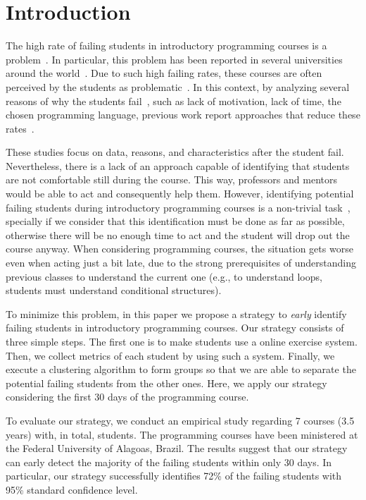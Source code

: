\section{Introduction}

The high rate of failing students in introductory programming courses is a problem~\cite{}. In particular, this problem has been reported in several universities around the world~\cite{}. Due to such high failing rates, these courses are often perceived by the students as problematic~\cite{yadin-inroads-acm-11}. In this context, by analyzing several reasons of why the students fail~\cite{why-dropout-icer06}, such as lack of motivation, lack of time, the chosen programming language, previous work report approaches that reduce these rates~\cite{yadin-inroads-acm-11, xxx}.

These studies focus on data, reasons, and characteristics after the student fail. Nevertheless, there is a lack of an approach capable of identifying that students are not comfortable still during the course. This way, professors and mentors would be able to act and consequently help them. However, identifying potential failing students during introductory programming courses is a non-trivial task~\cite{}, specially if we consider that this identification must be done as far as possible, otherwise there will be no enough time to act and the student will drop out the course anyway. When considering programming courses, the situation gets worse even when acting just a bit late, due to the strong prerequisites of understanding previous classes to understand the current one (e.g., to understand loops, students must understand conditional structures).

To minimize this problem, in this paper we propose a strategy to \textit{early} identify failing students in introductory programming courses. Our strategy consists of three simple steps. The first one is to make students use a online exercise system. Then, we collect metrics of each student by using such a system. Finally, we execute a clustering algorithm to form groups so that we are able to separate the potential failing students from the other ones. Here, we apply our strategy considering the first 30 days of the programming course.

To evaluate our strategy, we conduct an empirical study regarding 7 courses (3.5 years) with, in total, \totalStudents students. The programming courses have been ministered at the Federal University of Alagoas, Brazil. The results suggest that our strategy can early detect the majority of the failing students within only 30 days. In particular, our strategy successfully identifies 72\% of the failing students with 95\% standard confidence level.

